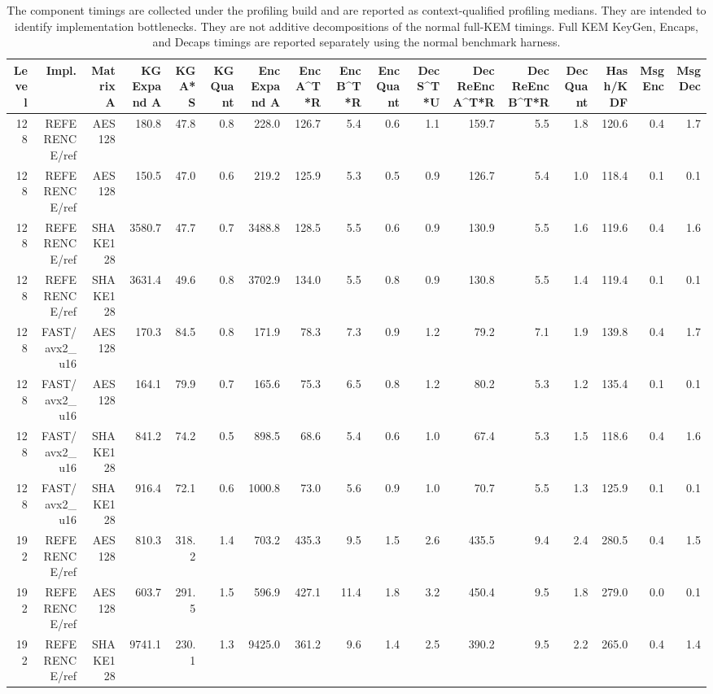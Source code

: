 \begin{table}[t]
\centering
\caption{The component timings are collected under the profiling build and are reported as context-qualified profiling medians. They are intended to identify implementation bottlenecks. They are not additive decompositions of the normal full-KEM timings. Full KEM KeyGen, Encaps, and Decaps timings are reported separately using the normal benchmark harness.}
\begin{tabular}{rrrrrrrrrrrrrrrrr}
\toprule
Level & Impl. & Matrix A & KG Expand A & KG A*S & KG Quant & Enc Expand A & Enc A^T*R & Enc B^T*R & Enc Quant & Dec S^T*U & Dec ReEnc A^T*R & Dec ReEnc B^T*R & Dec Quant & Hash/KDF & Msg Enc & Msg Dec \\
\midrule
128 & REFERENCE/ref & AES128 & 180.8 & 47.8 & 0.8 & 228.0 & 126.7 & 5.4 & 0.6 & 1.1 & 159.7 & 5.5 & 1.8 & 120.6 & 0.4 & 1.7 \\
128 & REFERENCE/ref & AES128 & 150.5 & 47.0 & 0.6 & 219.2 & 125.9 & 5.3 & 0.5 & 0.9 & 126.7 & 5.4 & 1.0 & 118.4 & 0.1 & 0.1 \\
128 & REFERENCE/ref & SHAKE128 & 3580.7 & 47.7 & 0.7 & 3488.8 & 128.5 & 5.5 & 0.6 & 0.9 & 130.9 & 5.5 & 1.6 & 119.6 & 0.4 & 1.6 \\
128 & REFERENCE/ref & SHAKE128 & 3631.4 & 49.6 & 0.8 & 3702.9 & 134.0 & 5.5 & 0.8 & 0.9 & 130.8 & 5.5 & 1.4 & 119.4 & 0.1 & 0.1 \\
128 & FAST/avx2_u16 & AES128 & 170.3 & 84.5 & 0.8 & 171.9 & 78.3 & 7.3 & 0.9 & 1.2 & 79.2 & 7.1 & 1.9 & 139.8 & 0.4 & 1.7 \\
128 & FAST/avx2_u16 & AES128 & 164.1 & 79.9 & 0.7 & 165.6 & 75.3 & 6.5 & 0.8 & 1.2 & 80.2 & 5.3 & 1.2 & 135.4 & 0.1 & 0.1 \\
128 & FAST/avx2_u16 & SHAKE128 & 841.2 & 74.2 & 0.5 & 898.5 & 68.6 & 5.4 & 0.6 & 1.0 & 67.4 & 5.3 & 1.5 & 118.6 & 0.4 & 1.6 \\
128 & FAST/avx2_u16 & SHAKE128 & 916.4 & 72.1 & 0.6 & 1000.8 & 73.0 & 5.6 & 0.9 & 1.0 & 70.7 & 5.5 & 1.3 & 125.9 & 0.1 & 0.1 \\
192 & REFERENCE/ref & AES128 & 810.3 & 318.2 & 1.4 & 703.2 & 435.3 & 9.5 & 1.5 & 2.6 & 435.5 & 9.4 & 2.4 & 280.5 & 0.4 & 1.5 \\
192 & REFERENCE/ref & AES128 & 603.7 & 291.5 & 1.5 & 596.9 & 427.1 & 11.4 & 1.8 & 3.2 & 450.4 & 9.5 & 1.8 & 279.0 & 0.0 & 0.1 \\
192 & REFERENCE/ref & SHAKE128 & 9741.1 & 230.1 & 1.3 & 9425.0 & 361.2 & 9.6 & 1.4 & 2.5 & 390.2 & 9.5 & 2.2 & 265.0 & 0.4 & 1.4 \\

\end{tabular}
\end{table}
